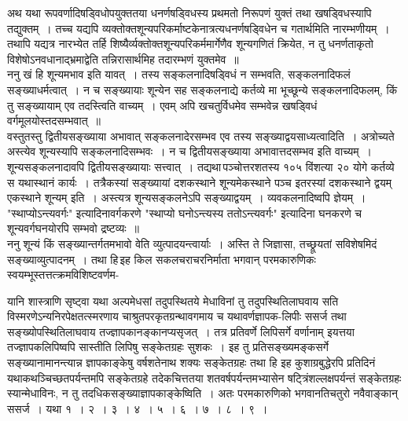 \documentclass[11pt, openany]{book}
\begin{document}
\vspace{2mm}
 अथ यथा रूपवर्णादिषड्विधोपयुक्ततया धनर्णषड्विधस्य प्रथमतो निरूपणं 
युक्तं तथा खषड्विधस्यापि तद्युक्तम्~। तच्च यद्यपि
व्यक्तोक्तशून्यपरिकर्माष्टकेनात्रत्यधनर्णषड्विधेन च गतार्थमिति नारम्भणीयम्~। तथापि यद्यत्र नारभ्येत तर्हि शिष्यैर्व्यक्तोक्तशून्यपरिकर्ममार्गेणैव शून्यगणितं क्रियेत, न तु
धनर्णताकृतो विशेषोऽनवधानाद्भ्रमाद्वेति तन्निरासार्थमिह तदारम्भणं युक्तमेव~॥ \\

\vspace{-3mm}
 ननु खं हि शून्यमभाव इति यावत्~। तस्य सङ्कलनादिषड्विधं न 
सम्भवति, सङ्कलनादिफलं सङ्ख्याधर्मत्वात्~। न च सङ्ख्यायाः शून्येन 
सह सङ्कलनाद्ये कर्तव्ये मा भूच्छून्ये सङ्कलनादिफलम्, किं तु सङ्ख्यायाम् एव
तदस्त्विति वाच्यम्~। एवम् अपि खचतुर्विधमेव सम्भवेन्न खषड्विधं वर्गमूलयोस्तदसम्भवात्~॥\\

\vspace{-3mm}
 वस्तुतस्तु द्वितीयसङ्ख्याया अभावात् सङ्कलनादेरसम्भव एव तस्य 
सङ्ख्याद्वयसाध्यत्वादिति~। अत्रोच्यते\textendash \,अस्त्येव शून्यस्यापि
सङ्कलनादिसम्भवः~। न च द्वितीयसङ्ख्याया अभावात्तदसम्भव इति वाच्यम्~। शून्यसङ्कलनादावपि द्वितीयसङ्ख्यायाः सत्त्वात्~। तद्यथा\textendash \,पञ्चोत्तरशतस्य १०५ विंशत्या २० योगे कर्तव्ये स यथास्थानं कार्यः~। तत्रैकस्यां सङ्ख्यायां दशकस्थाने शून्यमेकस्थाने पञ्च इतरस्यां दशकस्थाने द्वयम् एकस्थाने शून्यम् इति~। अस्त्यत्र शून्यसङ्कलनेऽपि सङ्ख्याद्वयम्~। व्यवकलनादिष्वपि ज्ञेयम्~।
{\qt "स्थाप्योऽन्त्यवर्गः"} इत्यादिनावर्गकरणे {\qt "स्थाप्यो घनोऽन्त्यस्य ततोऽन्त्यवर्गः"} इत्यादिना घनकरणे च शून्यवर्गघनयोरपि सम्भवो द्रष्टव्यः~॥\\

\vspace{-3mm}
 ननु शून्यं किं सङ्ख्यान्तर्गतमभावो वेति व्युत्पादयन्त्वार्याः~। अस्ति 
ते जिज्ञासा, तच्छ्रूयतां सविशेषमिदं सङ्ख्याव्युत्पादनम्~। तथा
हि\textendash \,इह किल 
सकलचराचरनिर्माता भगवान् परमकारुणिकः स्वयम्भूस्तत्तत्क्रमविशिष्टवर्णम-
\thispagestyle{empty}
\afterpage{\fancyhead[RO,LE]{\textbf{\thepage}}}
\cfoot{}
\newpage

\noindent यानि शास्त्राणि सृष्ट्वा यथा अल्पमेधसां तदुपस्थितये मेधाविनां तु तदुपस्थितिलाघवाय सति विस्मरणेऽन्यनिरपेक्षतत्स्मरणाय
चाश्रुतपरकृतग्रन्थावगमाय च यथावर्णज्ञापक-लिपीः ससर्ज तथा सङ्ख्योपस्थितिलाघवाय तज्ज्ञापकानङ्कानप्यसृजत्~। तत्र प्रतिवर्णे लिपिसर्गे वर्णानाम् इयत्तया तज्ज्ञापकलिपिष्वपि
सास्तीति लिपिषु सङ्केतग्रहः सुशकः~। इह तु प्रतिसङ्ख्यमङ्कसर्गे
सङ्ख्यानामानन्त्यान्न ज्ञापकाङ्केषु वर्षशतेनाथ शक्यः सङ्केतग्रहः तथा हि इह
कुशाग्रबुद्धेरपि प्रतिदिनं यथाकथञ्चिच्छतपर्यन्तमपि सङ्केतग्रहे तदेकचित्ततया
शतवर्षपर्यन्तमभ्यासेन षट्त्रिंशल्लक्षपर्यन्तं सङ्केतग्रहः स्यान्मेधाविनः, न तु
तदधिकसङ्ख्याज्ञापकाङ्केष्विति~। अतः परमकारुणिको भगवानतिचतुरो नवैवाङ्कान्
ससर्ज~। यथा १~। २~। ३~। ४~। ५~। ६~। ७~। ८~। ९~। \\
\end{document}
